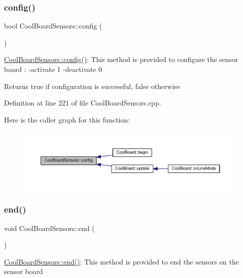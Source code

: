 \subsubsection{\texorpdfstring{config()}{config()}}
{\footnotesize\ttfamily bool Cool\+Board\+Sensors\+::config (\begin{DoxyParamCaption}{ }\end{DoxyParamCaption})}

\hyperlink{class_cool_board_sensors_a9a218895c5423375c33c08f2c56fb23a}{Cool\+Board\+Sensors\+::config()}\+: This method is provided to configure the sensor board \+: -\/activate 1 -\/deactivate 0

\begin{DoxyReturn}{Returns}
true if configuration is successful, false otherwise 
\end{DoxyReturn}


Definition at line 221 of file Cool\+Board\+Sensors.\+cpp.

Here is the caller graph for this function\+:\nopagebreak
\begin{figure}[H]
\begin{center}
\leavevmode
\includegraphics[width=350pt]{class_cool_board_sensors_a9a218895c5423375c33c08f2c56fb23a_icgraph}
\end{center}
\end{figure}
\mbox{\label{class_cool_board_sensors_a4902b69f6e628bd6557193758fdd2bae}} 
\subsubsection{\texorpdfstring{end()}{end()}}
{\footnotesize\ttfamily void Cool\+Board\+Sensors\+::end (\begin{DoxyParamCaption}{ }\end{DoxyParamCaption})}

\hyperlink{class_cool_board_sensors_a4902b69f6e628bd6557193758fdd2bae}{Cool\+Board\+Sensors\+::end()}\+: This method is provided to end the sensors on the sensor board 

